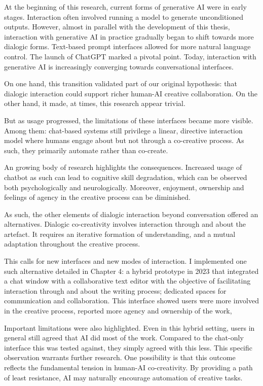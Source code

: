 At the beginning of this research, current forms of generative AI were in early stages. Interaction often involved running a model to generate unconditioned outputs. However, almost in parallel with the development of this thesis, interaction with generative AI in practice gradually began to shift towards more dialogic forms. Text-based prompt interfaces allowed for more natural language control. The launch of ChatGPT marked a pivotal point. Today, interaction with generative AI is increasingly converging towards conversational interfaces. 

On one hand, this transition validated part of our original hypothesis: that dialogic interaction could support richer human-AI creative collaboration. On the other hand, it made, at times, this research appear trivial. 

But as usage progressed, the limitations of these interfaces became more visible. Among them: chat-based systems still privilege a linear, directive interaction model where humans engage about but not through a co-creative process. As such, they primarily automate rather than co-create. 

An growing body of research highlights the consequences. Increased usage of chatbot as such can lead to cognitive skill degradation, which can be observed both psychologically and neurologically. Moreover, enjoyment, ownership and feelings of agency in the creative process can be diminished. 

As such, the other elements of dialogic interaction beyond conversation offered an alternatives. Dialogic co-creativity involves interaction through and about the artefact. It requires an iterative formation of understanding, and a mutual adaptation throughout the creative process.

This calls for new interfaces and new modes of interaction. I implemented one such alternative detailed in Chapter 4: a hybrid prototype in 2023 that integrated a chat window with a collaborative text editor with the objective of facilitating interaction through and about the writing process; dedicated spaces for communication and collaboration.  This interface showed users were more involved in the creative process, reported more agency and ownership of the work, 

Important limitations were also highlighted. Even in this hybrid setting, users in general still agreed that AI did most of the work. Compared to the chat-only interface this was tested against, they simply agreed with this less. This specific observation warrants further research. One possibility is that this outcome reflects the fundamental tension in human-AI co-creativity. By providing a path of least resistance, AI may naturally encourage automation of creative tasks.

